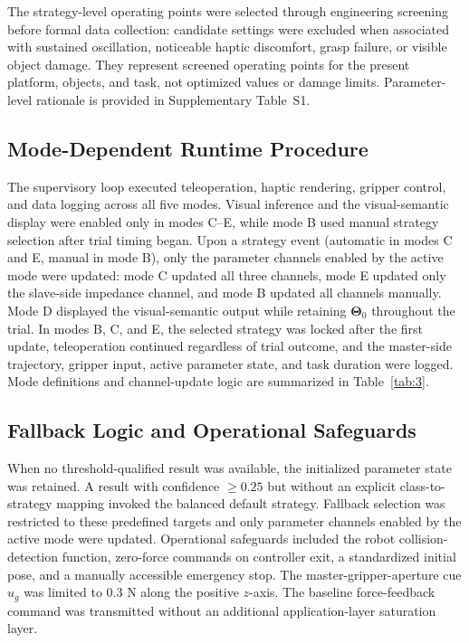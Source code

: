 The strategy-level operating points were selected through engineering screening before formal data collection: candidate settings were excluded when associated with sustained oscillation, noticeable haptic discomfort, grasp failure, or visible object damage. They represent screened operating points for the present platform, objects, and task, not optimized values or damage limits. Parameter-level rationale is provided in Supplementary Table~S1.
\subsection{Mode-Dependent Runtime Procedure}
The supervisory loop executed teleoperation, haptic rendering, gripper control, and data logging across all five modes. Visual inference and the visual-semantic display were enabled only in modes C--E, while mode B used manual strategy selection after trial timing began. Upon a strategy event (automatic in modes C and E, manual in mode B), only the parameter channels enabled by the active mode were updated: mode C updated all three channels, mode E updated only the slave-side impedance channel, and mode B updated all channels manually. Mode D displayed the visual-semantic output while retaining $\boldsymbol{\Theta}_0$ throughout the trial. In modes B, C, and E, the selected strategy was locked after the first update, teleoperation continued regardless of trial outcome, and the master-side trajectory, gripper input, active parameter state, and task duration were logged. Mode definitions and channel-update logic are summarized in Table~\ref{tab:3}.
\subsection{Fallback Logic and Operational Safeguards}
When no threshold-qualified result was available, the initialized parameter state was retained. A result with confidence $\geq0.25$ but without an explicit class-to-strategy mapping invoked the balanced default strategy. Fallback selection was restricted to these predefined targets and only parameter channels enabled by the active mode were updated. Operational safeguards included the robot collision-detection function, zero-force commands on controller exit, a standardized initial pose, and a manually accessible emergency stop. The master-gripper-aperture cue $u_g$ was limited to 0.3 N along the positive $z$-axis. The baseline force-feedback command was transmitted without an additional application-layer saturation layer.
